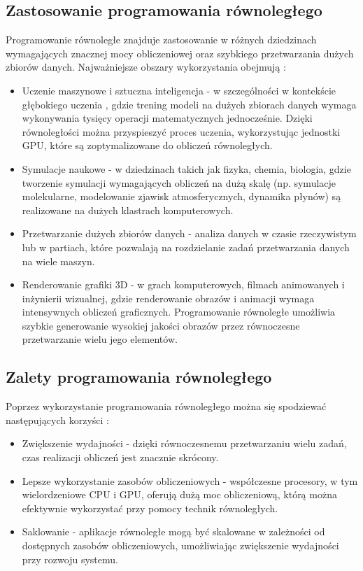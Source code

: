 \subsection{Zastosowanie programowania równoległego}
Programowanie równoległe znajduje zastosowanie w różnych dziedzinach wymagających znacznej mocy obliczeniowej oraz szybkiego przetwarzania dużych zbiorów danych. Najważniejsze obszary wykorzystania obejmują \cite{ParallelProgramming}:
\begin{itemize}
    \item Uczenie maszynowe i sztuczna inteligencja  - w szczególności w kontekście głębokiego uczenia , gdzie trening modeli na dużych zbiorach danych wymaga wykonywania tysięcy operacji matematycznych jednocześnie. Dzięki równoległości można przyspieszyć proces uczenia, wykorzystując jednostki GPU, które są zoptymalizowane do obliczeń równoległych.
    \item Symulacje naukowe - w dziedzinach takich jak fizyka, chemia, biologia, gdzie tworzenie symulacji wymagających obliczeń na dużą skalę (np. symulacje molekularne, modelowanie zjawisk atmosferycznych, dynamika płynów) są realizowane na dużych klastrach komputerowych.
    \item Przetwarzanie dużych zbiorów danych  - analiza danych w czasie rzeczywistym lub w partiach, które pozwalają na rozdzielanie zadań przetwarzania danych na wiele maszyn.
    \item Renderowanie grafiki 3D - w grach komputerowych, filmach animowanych i inżynierii wizualnej, gdzie renderowanie obrazów i animacji wymaga intensywnych obliczeń graficznych. Programowanie równoległe umożliwia szybkie generowanie wysokiej jakości obrazów przez równoczesne przetwarzanie wielu jego elementów.
\end{itemize}

\subsection{Zalety programowania równoległego}
Poprzez wykorzystanie programowania równoległego można się spodziewać następujących korzyści \cite{ParallelProgramming}:
\begin{itemize}
    \item Zwiększenie wydajności - dzięki równoczesnemu przetwarzaniu wielu zadań, czas realizacji obliczeń jest znacznie skrócony.
    \item Lepsze wykorzystanie zasobów obliczeniowych - współczesne procesory, w tym wielordzeniowe CPU i GPU, oferują dużą moc obliczeniową, którą można efektywnie wykorzystać przy pomocy technik równoległych.
    \item Saklowanie - aplikacje równoległe mogą być skalowane w zależności od dostępnych zasobów obliczeniowych, umożliwiając zwiększenie wydajności przy rozwoju systemu.
\end{itemize}

